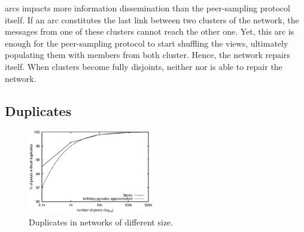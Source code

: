 \begin{asparadesc}
  arcs impacts more information dissemination than the peer-sampling
  protocol itself. If an arc constitutes the last link between two
  clusters of the network, the messages from one of these clusters
  cannot reach the other one. Yet, this arc is enough for the
  peer-sampling protocol to start shuffling the views, ultimately
  populating them with members from both cluster. Hence, the network
  repairs itself.  When clusters become fully disjoints, neither
  \CYCLON nor \SPRAY is able to repair the
  network.  %
\end{asparadesc}


\subsection{Duplicates}

\begin{figure}
  \centering
  \includegraphics[width=0.49\textwidth]{img/duplicates.eps}
  \caption{\label{fig:duplicates}Duplicates in networks of different size.}
\end{figure}

